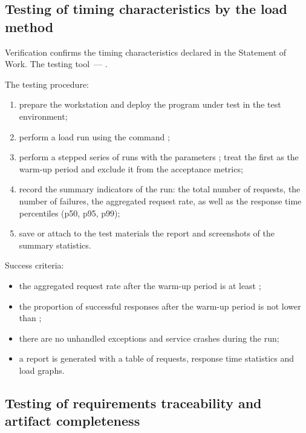 \documentclass[12pt,a4paper]{extarticle}
\begin{document}
\subsection{Testing of timing characteristics by the load method}

\begin{hseExample}
Verification confirms the timing characteristics declared in the Statement of Work. The testing tool~--- .

The testing procedure:
\begin{enumerate}[label=\arabic*), leftmargin=1.25cm]
    \item prepare the workstation and deploy the program under test in the test environment;
    \item perform a load run using the command ;
    \item perform a stepped series of runs with the parameters ; treat the first  as the warm-up period and exclude it from the acceptance metrics;
    \item record the summary indicators of the run: the total number of requests, the number of failures, the aggregated request rate, as well as the response time percentiles (p50, p95, p99);
    \item save or attach to the test materials the report and screenshots of the summary statistics.
\end{enumerate}

Success criteria:
\begin{itemize}[nosep, leftmargin=1.25cm]
    \item the aggregated request rate after the warm-up period is at least ;
    \item the proportion of successful responses after the warm-up period is not lower than ;
    \item there are no unhandled exceptions and service crashes during the run;
    \item a report is generated with a table of requests, response time statistics and load graphs.
\end{itemize}
\end{hseExample}

\subsection{Testing of requirements traceability and artifact completeness}
\end{document}
